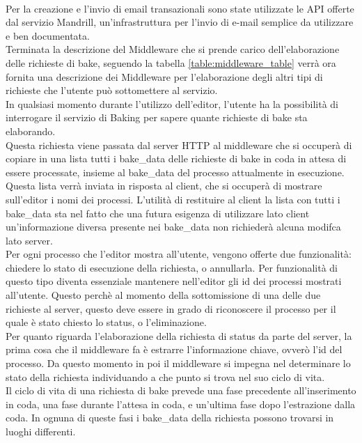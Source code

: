 \\
Per la creazione e l’invio di email transazionali sono state utilizzate le API offerte dal servizio Mandrill, un’infrastruttura per l’invio di e-mail semplice da utilizzare e ben documentata.
\\
Terminata la descrizione del Middleware che si prende carico dell'elaborazione delle richieste di bake, seguendo la tabella \ref{table:middleware_table} verrà ora fornita una descrizione dei Middleware per l'elaborazione degli altri tipi di richieste che l'utente può sottomettere al servizio.
\\ 
In qualsiasi momento durante l’utilizzo dell’editor, l’utente ha la possibilità di interrogare il servizio di Baking per sapere quante richieste di bake sta elaborando. 
\\
Questa richiesta viene passata dal server HTTP al middleware che si occuperà di copiare in una lista tutti i bake\_data delle richieste di bake in coda in attesa di essere processate, insieme al bake\_data del processo attualmente in esecuzione. 
Questa lista verrà inviata in risposta al client, che si occuperà di mostrare sull’editor i nomi dei processi.
L’utilità di restituire al client la lista con tutti i bake\_data sta nel fatto che una futura esigenza di utilizzare lato client un’informazione diversa presente nei bake\_data non richiederà alcuna modifca lato server. 
\\
Per ogni processo che l’editor mostra all’utente, vengono offerte due funzionalità: chiedere lo stato di esecuzione della richiesta, o annullarla. Per funzionalità di questo tipo diventa essenziale mantenere nell’editor gli id dei processi mostrati all’utente.
Questo perchè al momento della sottomissione di una delle due richieste al server, questo deve essere in grado di riconoscere il processo per il quale è stato chiesto lo status, o l’eliminazione. 
\\
Per quanto riguarda l’elaborazione della richiesta di status da parte del server, la prima cosa che il middleware fa è estrarre l’informazione chiave, ovverò l’id del processo. Da questo momento in poi il middleware si impegna nel determinare lo stato della richiesta individuando a che punto si trova nel suo ciclo di vita. 
\\
Il ciclo di vita di una richiesta di bake prevede una fase precedente all’inserimento in coda, una fase durante l’attesa in coda, e un’ultima fase dopo l’estrazione dalla coda. In ognuna di queste fasi i bake\_data della richiesta possono trovarsi in luoghi differenti. 
\\
